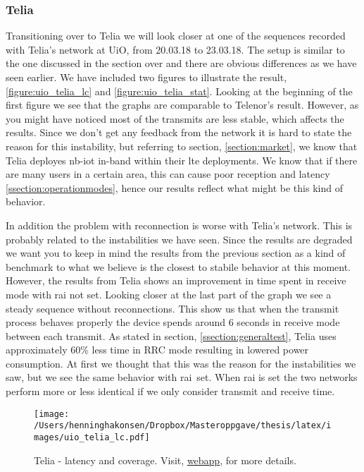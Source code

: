 \documentclass[USenglish]{ifimaster}  %
\begin{document}
\subsubsection{Telia}
Transitioning over to Telia we will look closer at one of the sequences recorded with Telia's network at UiO, from 20.03.18 to 23.03.18. The setup is similar to the one discussed in the section over and there are obvious differences as we have seen earlier. We have included two figures to illustrate the result, \vref{figure:uio_telia_lc} and \vref{figure:uio_telia_stat}.
Looking at the beginning of the first figure we see that the graphs are comparable to Telenor's result. However, as you might have noticed most of the transmits are less stable, which affects the results. Since we don't get any feedback from the network it is hard to state the reason for this instability, but referring to section, \vref{section:market}, we know that Telia deployes \acrshort{nb-iot} in-band within their \acrshort{lte} deployments. We know that if there are many users in a certain area, this can cause poor reception and latency \ref{ssection:operationmodes}, hence our results reflect what might be this kind of behavior.

In addition the problem with reconnection is worse with Telia's network. This is probably related to the instabilities we have seen. Since the results are degraded we want you to keep in mind the results from the previous section as a kind of benchmark to what we believe is the closest to stabile behavior at this moment. However, the results from Telia shows an improvement in time spent in receive mode with \acrshort{rai} not set. Looking closer at the last part of the graph we see a steady sequence without reconnections. This show us that when the transmit process behaves properly the device spends around 6 seconds in receive mode between each transmit. As stated in section, \vref{ssection:generaltest}, Telia uses approximately 60\% less time in RRC mode resulting in lowered power consumption. At first we thought that this was the reason for the instabilities we saw, but we see the same behavior with \acrshort{rai} set. When \acrshort{rai} is set the two networks perform more or less identical if we only consider transmit and receive time.

\begin{figure}[H]
  \centering
  \texttt{[image: /Users/henninghakonsen/Dropbox/Masteroppgave/thesis/latex/images/uio\_telia\_lc.pdf]}
  \caption{Telia - latency and coverage. Visit, \href{http://158.39.77.97:9000/\#/nodes/id1}{webapp}, for more details.}
  \label{figure:uio_telia_lc}
\end{figure}
\end{document}
